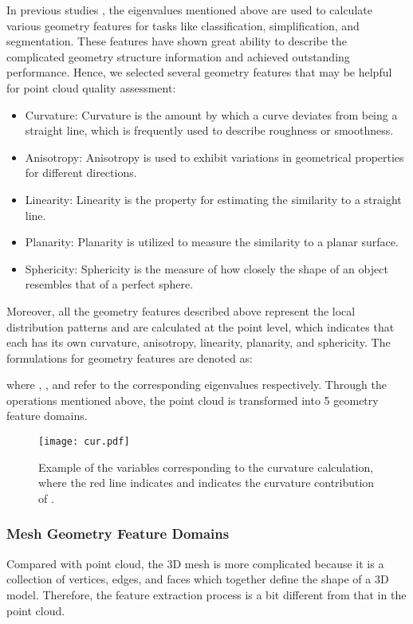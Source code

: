 \documentclass[lettersize,journal]{IEEEtran}
\begin{document}
In previous studies \cite{pcqa-curvature2} \cite{pc-eigenvalue1}, the eigenvalues mentioned above are used to calculate various geometry features for tasks like classification, simplification, and segmentation. These features have shown great ability to describe the complicated geometry structure information and achieved outstanding performance. Hence, we selected several geometry features that may be helpful for point cloud quality assessment: 
\begin{itemize}
    \item Curvature: Curvature is the amount by which a curve deviates from being a straight line, which is frequently used to describe roughness or smoothness.
    \item Anisotropy: Anisotropy is used to exhibit variations in geometrical properties for different directions.
    \item Linearity: Linearity is the property for estimating the similarity to a straight line.
    \item Planarity: Planarity is utilized to measure the similarity to a planar surface.
    \item Sphericity: Sphericity is the measure of how closely the shape of an object resembles that of a perfect sphere. 
\end{itemize}


Moreover, all the geometry features described above represent the local distribution patterns and are calculated at the point level, which indicates that each  has its own curvature, anisotropy, linearity, planarity, and sphericity.
The formulations \cite{pc-eigenvalue2} for geometry features are denoted as:

where , , and  refer to the corresponding eigenvalues respectively. Through the operations mentioned above, the point cloud is transformed into 5 geometry feature domains. 


\begin{figure}[t]
    \centering
    \texttt{[image: cur.pdf]}
    \caption{Example of the variables corresponding to the curvature calculation, where the red line indicates  and  indicates the curvature contribution of .}
    \label{fig:variables}
\end{figure}








\subsubsection{ Mesh Geometry Feature Domains}
\label{sec:mqa}
Compared with point cloud, the 3D mesh is more complicated because it is a collection of vertices, edges, and faces which together define the shape of a 3D model. Therefore, the feature extraction process is a bit different from that in the point cloud.
\end{document}

